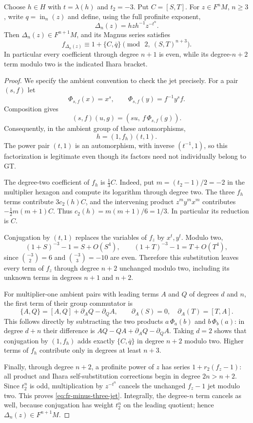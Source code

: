 \begin{lemma}\label{lem:fr-minus-three-jet}
Choose $h\in H$ with $t=\lambda(h)$ and $t_2=-3$.
Put $C=[S,T]$. For $z\in F^nM$, $n\ge3$, write
$q=\operatorname{in}_n(z)$ and define, using the full
profinite exponent,
\[
 \Delta_n(z)=hzh^{-1}z^{-t^n}.
\]
Then $\Delta_n(z)\in F^{n+1}M$, and its Magnus series satisfies
\begin{equation}\label{eq:fr-minus-three-jet}
 f_{\Delta_n(z)}
 \equiv1+\{C,\overline q\}
        \pmod{\,2,\ (S,T)^{n+3}}.
\end{equation}
In particular every coefficient through degree $n+1$ is
even, while its degree-$n+2$ term modulo two is the indicated
Ihara bracket.
\end{lemma}

\begin{proof}
We specify the ambient convention to check the jet precisely.
For a pair $(s,f)$ let
\[
 \Phi_{s,f}(x)=x^s,\qquad
 \Phi_{s,f}(y)=f^{-1}y^sf.
\]
Composition gives
\[
 (s,f)(u,g)=(su,\ f\,\Phi_{s,f}(g)).
\]
Consequently, in the ambient group of these automorphisms,
\[
 h=(1,f_h)(t,1).
\]
The power pair $(t,1)$ is an automorphism, with inverse
$(t^{-1},1)$, so this factorization is legitimate even though
its factors need not individually belong to GT.

The degree-two coefficient of $f_h$ is $\tfrac13 C$.
Indeed, put $m=(t_2-1)/2=-2$ in the multiplier hexagon
and compute its logarithm through degree two. The three
$f_h$ terms contribute $3c_2(h)C$, and the intervening
product $z^my^mx^m$ contributes
$-\tfrac12m(m+1)C$. Thus
$c_2(h)=m(m+1)/6=1/3$. In particular its reduction is $C$.

Conjugation by $(t,1)$ replaces the variables of $f_z$ by
$x^t,y^t$. Modulo two,
\[
 (1+S)^{-3}-1=S+O(S^4),\qquad
 (1+T)^{-3}-1=T+O(T^4),
\]
since $\binom{-3}{2}=6$ and $\binom{-3}{3}=-10$ are even.
Therefore this substitution leaves every term of $f_z$
through degree $n+2$ unchanged modulo two, including its
unknown terms in degrees $n+1$ and $n+2$.

For multiplier-one ambient pairs with leading terms $A$ and
$Q$ of degrees $d$ and $n$, the first term of their group
commutator is
\[
 \{A,Q\}=[A,Q]+\partial_AQ-\partial_QA,\qquad
 \partial_A(S)=0,\quad\partial_A(T)=[T,A].
\]
This follows directly by subtracting the two products
$a\,\Phi_a(b)$ and $b\,\Phi_b(a)$: in degree $d+n$ their
difference is $AQ-QA+\partial_AQ-\partial_QA$.
Taking $d=2$ shows that conjugation by $(1,f_h)$ adds exactly
$\{C,\overline q\}$ in degree $n+2$ modulo two. Higher terms
of $f_h$ contribute only in degrees at least $n+3$.

Finally, through degree $n+2$, a profinite power of $z$
has series $1+r_2(f_z-1)$: all product and Ihara
self-substitution corrections begin in degree $2n>n+2$.
Since $t_2^n$ is odd, multiplication by $z^{-t^n}$ cancels
the unchanged $f_z-1$ jet modulo two. This proves
\eqref{eq:fr-minus-three-jet}. Integrally, the degree-$n$
term cancels as well, because conjugation has weight
$t_2^n$ on the leading quotient; hence
$\Delta_n(z)\in F^{n+1}M$.
\end{proof}

